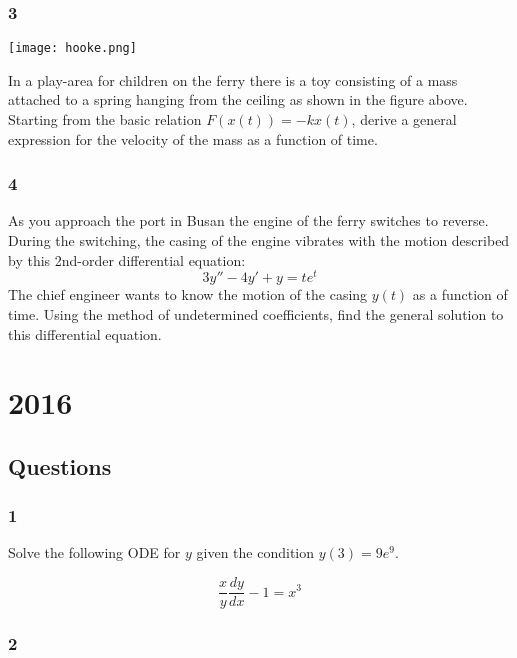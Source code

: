 \subsubsection{3}

\texttt{[image: hooke.png]}

In a play-area for children on the ferry there is a toy consisting of a mass attached to a spring hanging from the ceiling as shown in the figure above. Starting from the basic relation $F(x(t))=-kx(t)$, derive a general expression for the velocity of the mass as a function of time.




\subsubsection{4}

As you approach the port in Busan the engine of the ferry switches to reverse. During the switching, the casing of the engine vibrates with the motion described by this 2nd-order differential equation:
\begin{equation}
    3y''-4y'+y = t e^t
\end{equation}
The chief engineer wants to know the motion of the casing $y(t)$ as a function of time. Using the method of undetermined coefficients, find the general solution to this differential equation.




\newpage
\section{2016}
\subsection{Questions}
\subsubsection{1}

Solve the following ODE for $y$ given the condition $y(3)=9e^9$.

\begin{equation}
    \frac{x}{y} \frac{dy}{dx} - 1 = x^3
\end{equation}





\subsubsection{2}

